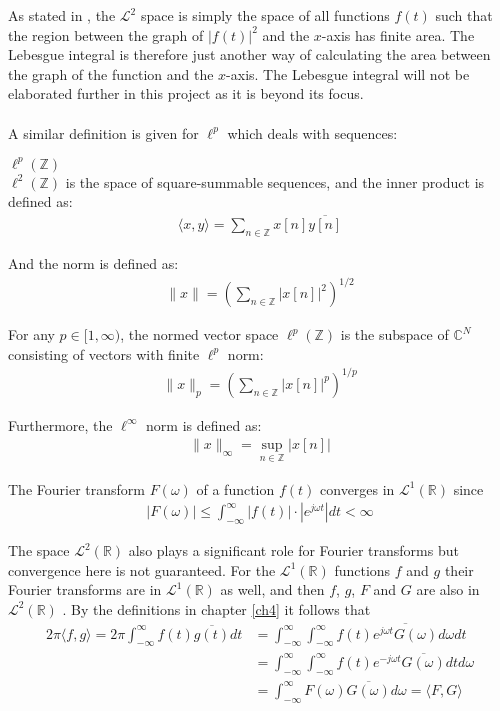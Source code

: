 As stated in \cite{page 74, FAA}, the $\mathcal{L}^2$ space is simply the space of all functions $f(t)$ such that the region between the graph of $|f(t)|^2$ and the $x$-axis  has finite area. The Lebesgue integral is therefore just another way of calculating the area between the graph of the function and the $x$-axis. The Lebesgue integral will not be elaborated further in this project as it is beyond its focus.
\\ \\
A similar definition is given for $\ell^p$ which deals with sequences:
\begin{definition}{$\ell^p(\mathbb{Z})$}
\\
$\ell^2(\mathbb{Z})$ is the space of square-summable sequences, and the inner product is defined as:
\begin{align*}
\langle x,y \rangle = \sum_{n\in\mathbb{Z}} x[n] \overline{y[n]}
\end{align*}

And the norm is defined as:
\begin{align*}
\|x\| = \left( \sum_{n\in\mathbb{Z}} |x[n]|^2 \right)^{1/2}
\end{align*}

For any $p \in [1,\infty)$, the normed vector space $\ell^p(\mathbb{Z})$ is the subspace of $\mathbb{C}^N$ consisting of vectors with finite $\ell^p$ norm:
\begin{align*}
\|x\|_p = \left( \sum_{n\in\mathbb{Z}} |x[n]|^p \right)^{1/p}
\end{align*}

Furthermore, the $\ell^\infty$ norm is defined as:
\begin{align*}
\|x\|_\infty = \sup_{n\in\mathbb{Z}}|x[n]|
\end{align*}
\end{definition}

\noindent
The Fourier transform $F(\omega)$ of a function $f(t)$ converges in $\mathcal{L}^1(\mathbb{R})$ since
\begin{align*}
|F(\omega)| \leq \int_{-\infty}^\infty |f(t)| \cdot |e^{j \omega t}| dt < \infty
\end{align*}

\noindent
The space $\mathcal{L}^2(\mathbb{R})$ also plays a significant role for Fourier transforms but convergence here is not guaranteed. For the $\mathcal{L}^1(\mathbb{R})$ functions $f$ and $g$ their Fourier transforms are in $\mathcal{L}^1(\mathbb{R})$ as well, and then $f$, $g$, $F$ and $G$ are also in $\mathcal{L}^2(\mathbb{R})$ \cite{page 219, FAA}. By the definitions in chapter \ref{ch4} it follows that
\begin{align*}
2\pi \langle f,g \rangle = 2\pi \int_{-\infty}^\infty f(t) \overline{g(t)} dt &= \int_{-\infty}^\infty \int_{-\infty}^\infty f(t) \overline{e^{j\omega t} G(\omega)} d\omega dt \\
&= \int_{-\infty}^\infty \int_{-\infty}^\infty f(t) e^{-j\omega t} \overline{G(\omega)} dt d\omega \\
&= \int_{-\infty}^\infty F(\omega) \overline{G(\omega)} d\omega = \langle F,G \rangle
\end{align*}

